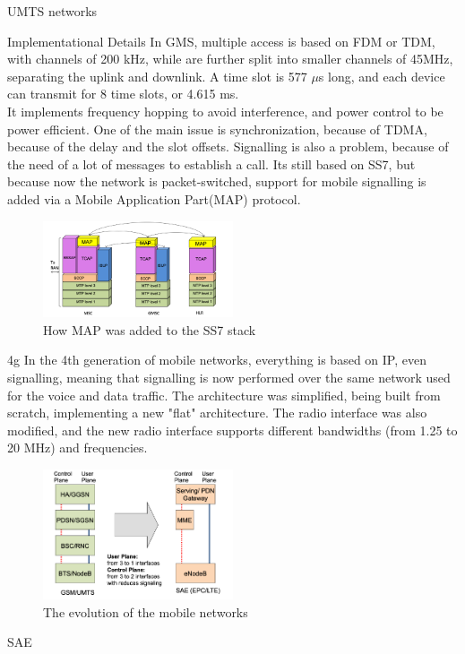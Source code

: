 \begin{section}{UMTS networks}
  \begin{subsection}{Implementational Details}
    In GMS, multiple access is based on FDM or TDM, with channels of 200 kHz, while are further 
    split into smaller channels of 45MHz, separating the uplink and downlink. A time slot is 577
    $\mu$s long, and each device can transmit for 8 time slots, or 4.615 ms.\\
    It implements frequency hopping to avoid interference, and power control to be power efficient.
    One of the main issue is synchronization, because of TDMA, because of the delay and the slot
    offsets. Signalling is also a problem, because of the need of a lot of messages to establish a
    call. Its still based on SS7, but because now the network is packet-switched, support for mobile
    signalling is added via a Mobile Application Part(MAP) protocol.\\
    \begin{figure}[h]
      \centering
      \includegraphics[width=0.5\textwidth]{img/wireless/mobile ss7.png}
      \caption{How MAP was added to the SS7 stack}
      \label{fig:mobile-ss7}
    \end{figure}
  \end{subsection}

\end{section}

\begin{section}{4g}
  In the 4th generation of mobile networks, everything is based on IP, even signalling, meaning that
  signalling is now performed over the same network used for the voice and data traffic. The
  architecture was simplified, being built from scratch, implementing a new "flat" architecture.
  The radio interface was also modified, and the new radio interface supports different bandwidths
  (from 1.25 to 20 MHz) and frequencies.

  \begin{figure}[h]
    \centering
    \includegraphics[width=0.5\textwidth]{img/wireless/4g evolution.png}
    \caption{The evolution of the mobile networks}
  \end{figure}
  \begin{subsection}{SAE}
  \end{subsection}

\end{section}

